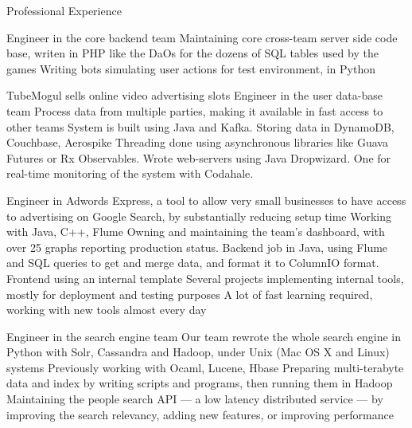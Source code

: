 \begin{rubric}{\color{ForestGreen} Professional Experience}


  Engineer in the core backend team
  Maintaining core cross-team server side code base, writen in PHP
  like the DaOs for the dozens of SQL tables used by the games
  Writing bots simulating user actions for test environment, in Python


   TubeMogul sells online video advertising slots
  Engineer in the user data-base team
  Process data from multiple parties, making it
available in fast access to other teams
  System is built using Java and Kafka. Storing data in DynamoDB, Couchbase,
 Aerospike
 \entry* Threading done using asynchronous libraries like Guava Futures or Rx Observables.
 \entry* Wrote web-servers using Java Dropwizard. One for real-time monitoring of the system with Codahale.

  \entry*[\multicolumn{1}{@{}>{\mykeyfont}p{2.5cm}}{%
\color{ForestGreen} {Feb 13 - Sep 14} \newline
\color{NavyBlue} G\color{Red} o\color{YellowOrange} o\color{NavyBlue} g\color{ForestGreen} l\color{Red} e}]
  Engineer in {Adwords Express}, a tool to allow very small businesses to have access to
 advertising on Google Search, by substantially reducing setup time
   Working with Java, C++, Flume
  Owning and maintaining the team's dashboard, with over 25 graphs reporting production status. Backend job in Java,
using Flume and SQL queries to get and merge data, and format it to ColumnIO format. Frontend using an internal template
  \entry* Several projects implementing internal tools, mostly for deployment and testing purposes
\entry* A lot of fast learning required, working with new tools almost every day


  Engineer in the {search engine team}
 Our team rewrote the whole search engine in Python with Solr, Cassandra
 and Hadoop, under Unix (Mac OS X and Linux) systems
 Previously working with Ocaml, Lucene, Hbase
  \entry*
  Preparing multi-terabyte data and index by writing scripts and programs,
  then running them in Hadoop
  \entry*
  Maintaining the people search API --- a low latency distributed
  service --- by improving the search relevancy, adding new features,
  or improving performance



\end{rubric}
